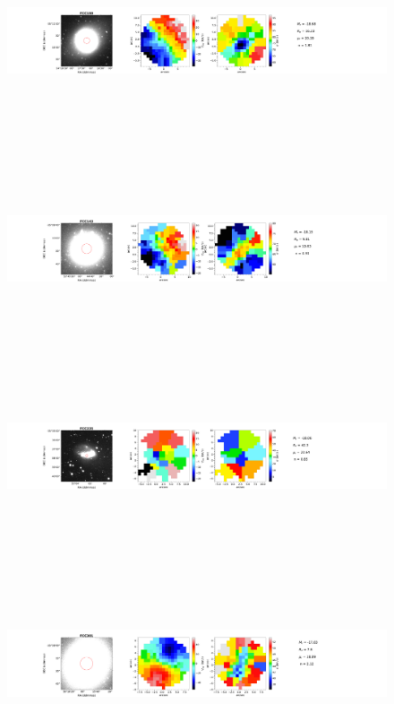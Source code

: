\documentclass{aa}
\begin{document}
\begin{figure}[!htb]
   \ContinuedFloat
   \centering
   \includegraphics[width=21cm,height=6cm,keepaspectratio]{../2_pipeline/1_V&S_Maps/190Velocity_map.pdf}
   \includegraphics[width=21cm,height=6cm,keepaspectratio]{../2_pipeline/1_V&S_Maps/143Velocity_map.pdf}
   \includegraphics[width=21cm,height=6cm,keepaspectratio]{../2_pipeline/1_V&S_Maps/235Velocity_map.pdf}
   \includegraphics[width=21cm,height=6cm,keepaspectratio]{../2_pipeline/1_V&S_Maps/301Velocity_map.pdf}

\end{figure}
\end{document}
